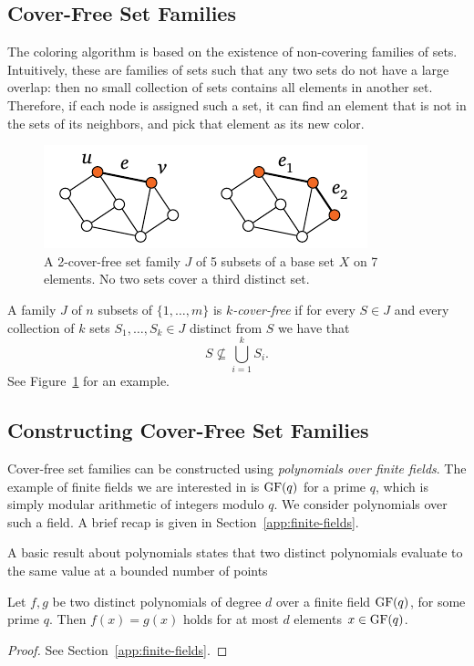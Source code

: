 \subsection{Cover-Free Set Families}

The coloring algorithm is based on the existence of non-covering families of sets. Intuitively, these are families of sets such that any two sets do not have a large overlap: then no small collection of sets contains all elements in another set. Therefore, if each node is assigned such a set, it can find an element that is not in the sets of its neighbors, and pick that element as its new color.

\begin{figure}
  \centering
  \includegraphics[scale=0.4,page=\PCoverFreeSet]{figs.pdf}
  \caption{A 2-cover-free set family $J$ of 5 subsets of a base set $X$ on 7 elements. No two sets cover a third distinct set.}\label{fig:cover-free-sets}
\end{figure}

A family $J$ of $n$ subsets of $\{1, \dots, m \}$ is \emph{$k$-cover-free} if for every $S \in J$ and every collection of $k$ sets $S_1, \dots, S_k \in J$ distinct from $S$ we have that
\[
  S \nsubseteq \bigcup_{i=1}^{k} S_i.
\]
See Figure~\ref{fig:cover-free-sets} for an example.

\subsection{Constructing Cover-Free Set Families}

Cover-free set families can be constructed using \emph{polynomials over finite fields}. The example of finite fields we are interested in is $\operatorname{GF}(q)$ for a prime $q$, which is simply modular arithmetic of integers modulo $q$. We consider polynomials over such a field. A brief recap is given in Section~\ref{app:finite-fields}.

A basic result about polynomials states that two distinct polynomials evaluate to the same value at a bounded number of points

\begin{lemma} \label{lem:poly-roots}
  Let $f,g$ be two distinct polynomials of degree $d$ over a finite field $\operatorname{GF}(q)$, for some prime $q$. Then $f(x) = g(x)$ holds for at most $d$ elements $x \in \operatorname{GF}(q)$.
\end{lemma}
\begin{proof}
See Section~\ref{app:finite-fields}.
\end{proof}


